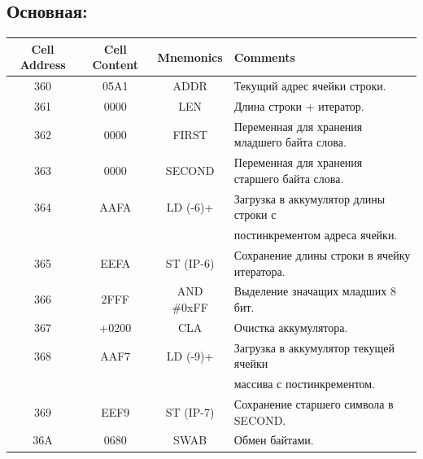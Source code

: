 \subsection{Основная:}
\begin{center}
    \begin{tabular}{|c|c|c|l|}
        \hline
        \textbf{Cell Address} & \textbf{Cell Content} & \textbf{Mnemonics} & \textbf{Comments}                                   \\
        \hline
        360                   & 05A1                  & ADDR               & Текущий адрес ячейки строки.                        \\
        361                   & 0000                  & LEN                & Длина строки + итератор.                            \\
        362                   & 0000                  & FIRST             & Переменная для хранения младшего байта слова.       \\
        363                   & 0000                  & SECOND                & Переменная для хранения старшего байта слова.       \\
        \hline
        364                   & AAFA                  & LD (-6)+           & Загрузка в аккумулятор длины строки с               \\
        &                       &                    & постинкрементом адреса ячейки.                      \\
        365                   & EEFA                  & ST (IP-6)          & Сохранение длины строки в ячейку итератора.         \\
        366                   & 2FFF                  & AND \#0xFF         & Выделение значащих младших 8 бит.                   \\
        \hline
        367                   & +0200                 & CLA                & Очистка аккумулятора.                               \\
        368                   & AAF7                  & LD (-9)+           & Загрузка в аккумулятор текущей ячейки               \\
        &                       &                    & массива с постинкрементом.                          \\
        369                   & EEF9                  & ST (IP-7)          & Сохранение старшего символа в SECOND.                  \\
        36A                   & 0680                  & SWAB               & Обмен байтами.                                      \\

\end{tabular}
\end{center}
